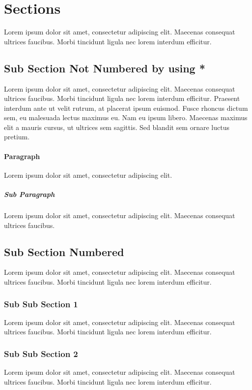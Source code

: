 \section{Sections}
Lorem ipsum dolor sit amet, consectetur adipiscing elit. Maecenas consequat ultrices faucibus. Morbi tincidunt ligula nec lorem interdum efficitur.

\subsection*{Sub Section Not Numbered by using *}
Lorem ipsum dolor sit amet, consectetur adipiscing elit. Maecenas consequat ultrices faucibus. Morbi tincidunt ligula nec lorem interdum efficitur. Praesent interdum ante ut velit rutrum, at placerat ipsum euismod. Fusce rhoncus dictum sem, eu malesuada lectus maximus eu. Nam eu ipsum libero. Maecenas maximus elit a mauris cursus, ut ultrices sem sagittis. Sed blandit sem ornare luctus pretium.
\paragraph{Paragraph}
Lorem ipsum dolor sit amet, consectetur adipiscing elit.
\subparagraph{Sub Paragraph}
Lorem ipsum dolor sit amet, consectetur adipiscing elit. Maecenas consequat ultrices faucibus.

\subsection{Sub Section Numbered}
Lorem ipsum dolor sit amet, consectetur adipiscing elit. Maecenas consequat ultrices faucibus. Morbi tincidunt ligula nec lorem interdum efficitur.
\subsubsection{Sub Sub Section 1}
Lorem ipsum dolor sit amet, consectetur adipiscing elit. Maecenas consequat ultrices faucibus. Morbi tincidunt ligula nec lorem interdum efficitur.
\subsubsection{Sub Sub Section 2}
Lorem ipsum dolor sit amet, consectetur adipiscing elit. Maecenas consequat ultrices faucibus. Morbi tincidunt ligula nec lorem interdum efficitur.